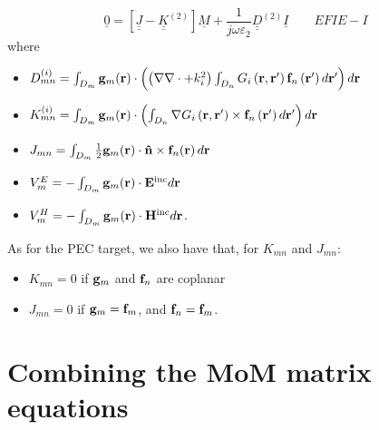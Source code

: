 \begin{equation}\label{eqn:Matrix EFIE-I}
\boxed{\underline{0} =  \left[\underline{\underline{J}} - \underline{\underline{K}}^{(2)} \right] \underline{M} + \frac{1}{j \omega \varepsilon_2}  \underline{\underline{D}}^{(2)} \underline{I} } \qquad EFIE-I 
\end{equation}
where
\begin{itemize}
\item $D_{mn}^{(i)} = \int_{D_m}\mathbf{g}_m \!\left(\mathbf{r}\right) \cdot \left( \left(\nabla \nabla \cdot + k_i^2\right) \int_{D_n} G_i\left(\mathbf{r}, \mathbf{r}'\right) \mathbf{f}_n\left(\mathbf{r}'\right) d\mathbf{r}' \right) d\mathbf{r}$
\item $K_{mn}^{(i)} = \int_{D_m} \mathbf{g}_m \!\left(\mathbf{r}\right) \cdot \left(\int_{D_n} \nabla G_i\left(\mathbf{r}, \mathbf{r}'\right) \times \mathbf{f}_n\left(\mathbf{r}'\right) d\mathbf{r}'\right) d\mathbf{r}$
\item $J_{mn} = \int_{D_m} \frac{1}{2} \mathbf{g}_m \!\left(\mathbf{r}\right) \cdot \mathbf{\hat{n}} \times \mathbf{f}_{n}\!\left(\mathbf{r}\right)d\mathbf{r}$
\item $V_m^{E} = -\int_{D_m}\mathbf{g}_m \!\left(\mathbf{r}\right) \cdot \mathbf{E}^\text{inc} d\mathbf{r}$
\item $V_m^{H} = -\int_{D_m}\mathbf{g}_m \!\left(\mathbf{r}\right) \cdot \mathbf{H}^\text{inc} d\mathbf{r}$.
\end{itemize}
%
\par
As for the PEC target, we also have that, for $K_{mn}$ and $J_{mn}$:
\begin{itemize}
\item $K_{mn} = 0$ if $\mathbf{g}_m$ and $\mathbf{f}_n$ are coplanar
\item $J_{mn} = 0$ if $\mathbf{g}_m = \mathbf{f}_m$, and $\mathbf{f}_n = \mathbf{f}_m$.
\end{itemize}

\section{Combining the MoM matrix equations}
%
\par
